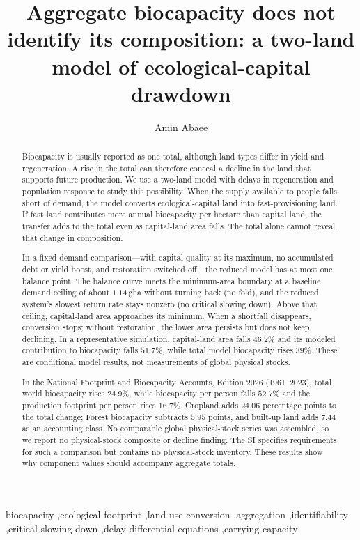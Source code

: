 \documentclass[preprint,12pt,authoryear]{elsarticle}
\begin{document}
\begin{frontmatter}

\title{Aggregate biocapacity does not identify its composition: a two-land model of ecological-capital drawdown}

\author[1]{Amin Abaee}

\begin{abstract}
\footnotesize
Biocapacity is usually reported as one total, although land types differ in yield and regeneration. A rise in the total can therefore conceal a decline in the land that supports future production. We use a two-land model with delays in regeneration and population response to study this possibility. When the supply available to people falls short of demand, the model converts ecological-capital land into fast-provisioning land. If fast land contributes more annual biocapacity per hectare than capital land, the transfer adds to the total even as capital-land area falls. The total alone cannot reveal that change in composition.

In a fixed-demand comparison—with capital quality at its maximum, no accumulated debt or yield boost, and restoration switched off—the reduced model has at most one balance point. The balance curve meets the minimum-area boundary at a baseline demand ceiling of about $1.14$\,gha without turning back (no fold), and the reduced system's slowest return rate stays nonzero (no critical slowing down). Above that ceiling, capital-land area approaches its minimum. When a shortfall disappears, conversion stops; without restoration, the lower area persists but does not keep declining. In a representative simulation, capital-land area falls $46.2\%$ and its modeled contribution to biocapacity falls $51.7\%$, while total model biocapacity rises $39\%$. These are conditional model results, not measurements of global physical stocks.

In the National Footprint and Biocapacity Accounts, Edition 2026 (1961--2023), total world biocapacity rises $24.9\%$, while biocapacity per person falls $52.7\%$ and the production footprint per person rises $16.7\%$. Cropland adds $24.06$ percentage points to the total change; Forest biocapacity subtracts $5.95$ points, and built-up land adds $7.44$ as an accounting class. No comparable global physical-stock series was assembled, so we report no physical-stock composite or decline finding. The SI specifies requirements for such a comparison but contains no physical-stock inventory. These results show why component values should accompany aggregate totals.
\end{abstract}

\begin{keyword}
\footnotesize
biocapacity \sep ecological footprint \sep land-use conversion \sep aggregation \sep identifiability \sep critical slowing down \sep delay differential equations \sep carrying capacity
\end{keyword}

\end{frontmatter}
\end{document}
